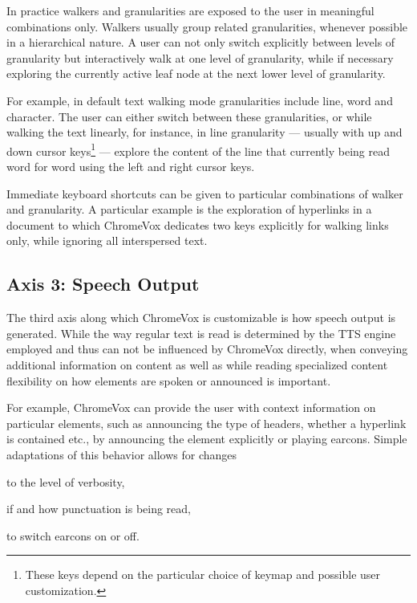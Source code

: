 \documentclass{sig-alternate}
\begin{document}
In practice walkers and granularities are exposed to the user in meaningful
combinations only. Walkers usually group related granularities, whenever
possible in a hierarchical nature.  A user can not only switch explicitly
between levels of granularity but interactively walk at one level of
granularity, while if necessary exploring the currently active leaf node at the
next lower level of granularity.

For example, in default text walking mode granularities include line, word and
character. The user can either switch between these granularities, or while
walking the text linearly, for instance, in line granularity --- usually with up
and down cursor keys\footnote{These keys depend on the particular choice of
  keymap and possible user customization.}  --- explore the content of the line
that currently being read word for word using the left and right cursor keys.

Immediate keyboard shortcuts can be given to particular combinations of walker
and granularity. A particular example is the exploration of hyperlinks in a
document to which ChromeVox dedicates two keys explicitly for walking links
only, while ignoring all interspersed text.

\subsection{Axis 3: Speech Output}
\label{sec:ax3}

The third axis along which ChromeVox is customizable is how speech output is
generated. While the way regular text is read is determined by the TTS engine
employed and thus can not be influenced by ChromeVox directly, when conveying
additional information on content as well as while reading specialized content
flexibility on how elements are spoken or announced is important.

For example, ChromeVox can provide the user with context information on
particular elements, such as announcing the type of headers, whether a hyperlink
is contained etc., by announcing the element explicitly or playing
earcons. Simple adaptations of this behavior allows for changes
\begin{inparaenum}[(a)]
\item to the level of verbosity,
\item if and how punctuation is being read,
\item to switch earcons on or off.
\end{inparaenum}
\end{document}
